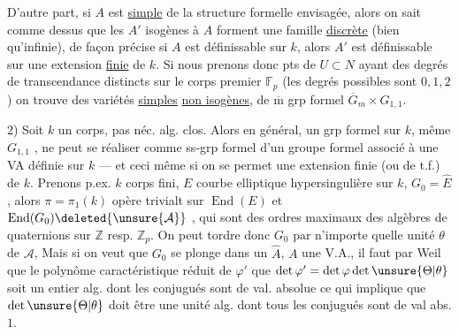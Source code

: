 
D'autre part, si $A$ est \uline{simple} de la structure formelle envisagée, alors on sait comme dessus que  les $A'$ isogènes à $A$ forment une famille \uline{discrète} (bien qu'infinie), de façon précise si $A$ est définissable sur $k$, alors $A'$ est définissable sur une extension \uline{finie} de $k$. Si nous prenons donc pts de  $U\subset N$  ayant des degrés de transcendance distincts sur le corps premier $\mathbb F_p$ (les degrés possibles sont $0,1,2$) on trouve des variétés \uline{simples} \uline{non isogènes}, de $\overline{\mathrm m}$ grp formel $\overline G_m\times G_{1,1}$.



2) Soit $k$ un corps, pas néc. alg. clos. Alors en général, un grp formel  sur $k$, même  $G_{1,1}$ , ne peut se réaliser comme ss-grp formel d'un groupe formel associé à une VA définie sur $k$ --- et ceci même si on se permet une extension finie  (ou de t.f.) de $k$. Prenons p.ex. $k$ corps fini, $E$ courbe elliptique hypersingulière sur $k$,   $G_0=\widehat E$, alors $\pi=\pi_1(k)$ opère trivialt sur $\operatorname{End}(E)$ et $\operatorname{End}(G_0)\deleted{\unsure{\mathcal A}}$ , qui sont des   ordres maximaux des algèbres de quaternions sur $\mathbb Z$ resp. $\mathbb Z_p$. On peut tordre donc $G_0$ par n'importe quelle unité $\theta$ de $\mathcal A$,   Mais si on veut que $G_0$ se plonge dans un $\widehat A$, $A$ une V.A., il faut par Weil que le polynôme caractéristique réduit de $\varphi'$ \inserted{$=\unsure{\Theta|\theta}\varphi$}      que $\det\varphi'=\det\varphi\det\unsure{\Theta|\theta}$  soit un entier alg. dont  les conjugués sont de val. absolue \unsure{,} ce qui implique que $\det\unsure{\Theta|\theta}$ doit être une unité alg. dont tous les conjugués sont de val abs. $1$.

